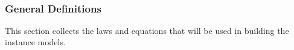 \documentclass[12pt]{article}
\begin{document}

~\newline

\subsubsection{General Definitions}\label{sec_gendef}


This section collects the laws and equations that will be used in building the
instance models.


\end{document}
